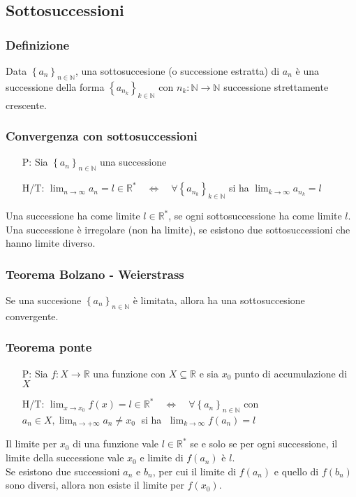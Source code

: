 \documentclass[a4paper]{article}
\begin{document}
\subsection{Sottosuccessioni}
\subsubsection*{Definizione}
Data \(\left\{ a_n \right\}_{n \in \mathbb{N}}\), una sottosuccesione (o successione estratta) di \(a_n\) è una successione della forma \(\left\{ a_{n_k} \right\}_{k \in \mathbb{N}}\)
con \(n_k : \mathbb{N} \to \mathbb{N}\) successione strettamente crescente.

\subsubsection*{Convergenza con sottosuccessioni}
\begin{itemize}
	\item[P:] Sia \(\left\{ a_n \right\}_{n \in \mathbb{N}}\) una successione
	\item[H/T:] \(\displaystyle \lim_{n \to \infty} a_n = l \in \mathbb{R}^* \quad \Leftrightarrow \quad \forall \left\{ a_{n_k} \right\}_{k \in \mathbb{N}}\) si ha \(\displaystyle \lim_{k \to \infty} a_{n_k} = l\)
\end{itemize}
Una successione ha come limite \(l \in \mathbb{R}^*\), se ogni sottosuccessione ha come limite \(l\). \\
Una successione è irregolare (non ha limite), se esistono due sottosuccessioni che hanno limite diverso.

\subsubsection*{Teorema Bolzano - Weierstrass}
Se una succesione \(\left\{ a_n \right\}_{n \in \mathbb{N}}\) è limitata, allora ha una sottosuccesione convergente.

\subsubsection*{Teorema ponte}
\begin{itemize}
	\item[P:] Sia \(f: X \to \mathbb{R}\) una funzione con \(X \subseteq \mathbb{R}\) e sia \(x_0\) punto di accumulazione di \(X\)
	\item[H/T:] \(\displaystyle \lim_{x \to x_0} f(x) = l \in \mathbb{R}^* \quad \Leftrightarrow \quad \forall \left\{ a_n \right\}_{n \in \mathbb{N}}\) con \(\displaystyle a_n \in X, \lim_{n \to +\infty} a_n \neq x_0 \;\) si ha \(\; \displaystyle \lim_{k \to \infty} f(a_n) = l\)
\end{itemize}
Il limite per \(x_0\) di una funzione vale \(l \in \mathbb{R}^*\) se e solo se per ogni successione, il limite della successione vale \(x_0\) e limite di \(f(a_n)\) è \(l\). \\
Se esistono due successioni \(a_n\) e \(b_n\), per cui il limite di \(f(a_n)\) e quello di \(f(b_n)\) sono diversi, allora non esiste il limite per \(f(x_0)\).
\end{document}
